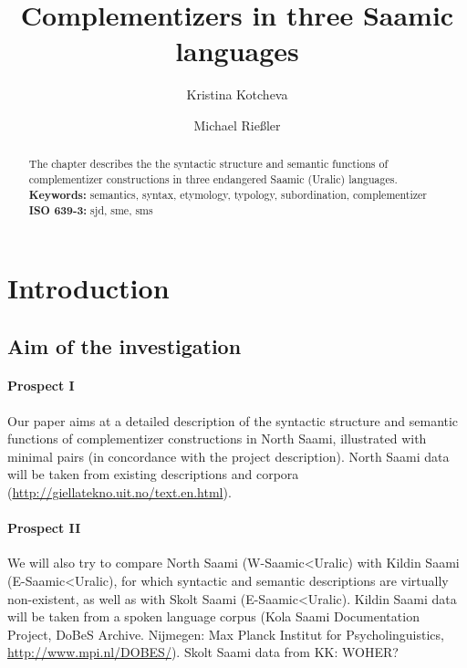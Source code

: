 \documentclass[a4,12pt]{scrartcl}
\title{Complementizers in three Saamic languages}
\author[1]{Kristina Kotcheva}
\author[2]{Michael Rießler}
\affil[1]{Department of Linguistics, University of Konstanz}
\affil[2]{Scandinavian Department, University of Freiburg}
\begin{document}

\tableofcontents 
\newpage

\maketitle

\begin{abstract}
The chapter describes the the syntactic structure and semantic functions of complementizer constructions in three endangered Saamic (Uralic) languages.\\%

{\bf Keywords:} semantics, syntax, etymology, typology, subordination, complementizer\\

{\bf ISO 639-3:} sjd, sme, sms 
\end{abstract}


\section{Introduction}\label{intro}

\subsection{Aim of the investigation}

\paragraph{Prospect I}  Our paper aims at a detailed description of the syntactic structure and semantic functions of complementizer constructions in North Saami, illustrated with minimal pairs (in concordance with the project description). North Saami data will be taken from existing descriptions \cite[e.g.]{nickel1994, sammallahti1998b, nielsen1979-1} and corpora (\url{http://giellatekno.uit.no/text.en.html}).  %

\paragraph{Prospect II} We will also try to compare North Saami (W-Saamic<Uralic) with Kildin Saami (E-Saamic<Uralic), for which syntactic and semantic descriptions are virtually non-existent, as well as with Skolt Saami (E-Saamic<Uralic). Kildin Saami data will be taken from a spoken language corpus (Kola Saami Documentation Project, DoBeS Archive. Nijmegen: Max Planck 
Institut for Psycholinguistics, \url{http://www.mpi.nl/DOBES/}).%
Skolt Saami data from KK: WOHER? 
\end{document}
